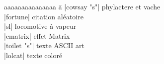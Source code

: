 \documentclass{article}
\let\oldkeys\keys
\renewcommand{\keys}[1]{\small\oldkeys{#1}\normalsize}
\newenvironment{cmdblock}{%
  \par\setlength{\parindent}{0pt}\setlength{\parskip}{0pt}%
  \RaggedRight%
}{\par}
\newlength{\cmdoptindent}
\newcommand{\cmdopt}[1]{%
  \hspace*{\cmdoptindent}%
  \begin{minipage}[t]{\dimexpr\linewidth-\cmdoptindent\relax}
    \RaggedRight \itshape #1%
  \end{minipage}\par
}
\begin{document}
\begin{multicols}{4}
    \begin{tabbing}
        aaaaaaaaaaaaaaa \= a \kill
        \code|cowsay "s"| \> phylactere et vache \\
        \code|fortune| \> citation aléatoire  \\
        \code|sl| \> locomotive à vapeur  \\
        \code|cmatrix| \> effet Matrix  \\
        \code|toilet "s"| \> texte ASCII art  \\
        \code|lolcat| \> texte coloré
    \end{tabbing}




\end{multicols}
\end{document}

